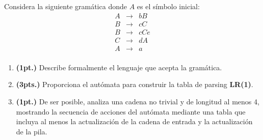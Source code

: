
Considera la siguiente gram\'atica donde $A$ es el s\'imbolo inicial:
\[
\begin{array}{rcl}
A & \to & bB \\
B & \to & cC \\
B & \to & cCe \\
C & \to & dA\\
A & \to & a\\
\end{array}
\]
\begin{enumerate}
\item \textbf{(1pt.)} Describe formalmente el lenguaje que acepta la gram\'atica.
\item \textbf{(3pts.)} Proporciona el aut\'omata para construir la tabla de 
parsing \textbf{LR(1)}.
\item \textbf{(1pt.)} De ser posible, analiza una cadena no trivial y de longitud 
al menos 4, mostrando la secuencia de acciones del aut\'omata mediante una tabla 
que incluya al menos la actualizaci\'on de la cadena de entrada y la actualizaci\'on
de la pila.
\end{enumerate}
